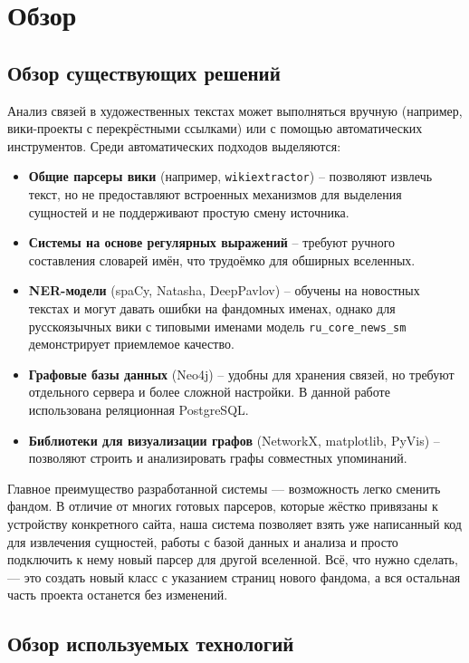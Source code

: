 \section{Обзор}
\label{sec:relatedworks}

\subsection{Обзор существующих решений}

Анализ связей в художественных текстах может выполняться вручную (например, вики-проекты с перекрёстными ссылками) или с помощью автоматических инструментов. Среди автоматических подходов выделяются:

\begin{itemize}
    \item \textbf{Общие парсеры вики} (например, \texttt{wikiextractor}) – позволяют извлечь текст, но не предоставляют встроенных механизмов для выделения сущностей и не поддерживают простую смену источника.
    \item \textbf{Системы на основе регулярных выражений} – требуют ручного составления словарей имён, что трудоёмко для обширных вселенных.
    \item \textbf{NER-модели} (spaCy, Natasha, DeepPavlov) – обучены на новостных текстах и могут давать ошибки на фандомных именах, однако для русскоязычных вики с типовыми именами модель \texttt{ru\_core\_news\_sm} демонстрирует приемлемое качество.
    \item \textbf{Графовые базы данных} (Neo4j) – удобны для хранения связей, но требуют отдельного сервера и более сложной настройки. В данной работе использована реляционная PostgreSQL.
    \item \textbf{Библиотеки для визуализации графов} (NetworkX, matplotlib, PyVis) – позволяют строить и анализировать графы совместных упоминаний.
\end{itemize}

Главное преимущество разработанной системы — возможность легко сменить фандом. В отличие от многих готовых парсеров, которые жёстко привязаны к устройству конкретного сайта, наша система позволяет взять уже написанный код для извлечения сущностей, работы с базой данных и анализа и просто подключить к нему новый парсер для другой вселенной. Всё, что нужно сделать, — это создать новый класс с указанием страниц нового фандома, а вся остальная часть проекта останется без изменений.

\subsection{Обзор используемых технологий}

